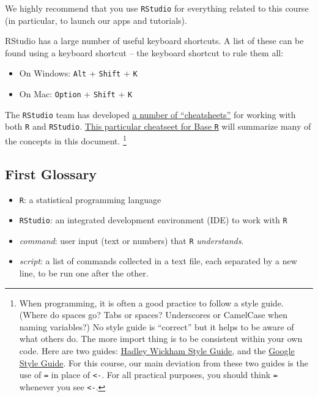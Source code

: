 \documentclass[]{book}
\providecommand{\tightlist}{%
  \setlength{\itemsep}{0pt}\setlength{\parskip}{0pt}}
\newenvironment{note}{\begin{tcolorbox}[colback=blue!5!white,colframe=blue!75!black]}{\end{tcolorbox}}
\begin{document}
\begin{note}
We highly recommend that you use \texttt{RStudio} for everything related
to this course (in particular, to launch our apps and tutorials).
\end{note}

RStudio has a large number of useful keyboard shortcuts. A list of these can be found using a keyboard shortcut -- the keyboard shortcut to rule them all:

\begin{itemize}
\tightlist
\item
  On Windows: \texttt{Alt} + \texttt{Shift} + \texttt{K}
\item
  On Mac: \texttt{Option} + \texttt{Shift} + \texttt{K}
\end{itemize}

The \texttt{RStudio} team has developed \href{https://www.rstudio.com/resources/cheatsheets/}{a number of ``cheatsheets''} for working with both \texttt{R} and \texttt{RStudio}. \href{http://www.rstudio.com/wp-content/uploads/2016/05/base-r.pdf}{This particular cheatseet for Base \texttt{R}} will summarize many of the concepts in this document. \footnote{When programming, it is often a good practice to follow a style guide. (Where do spaces go? Tabs or spaces? Underscores or CamelCase when naming variables?) No style guide is ``correct'' but it helps to be aware of what others do. The more import thing is to be consistent within your own code. Here are two guides: \href{http://adv-r.had.co.nz/Style.html}{Hadley Wickham Style Guide}, and the \href{https://google.github.io/styleguide/Rguide.xml}{Google Style Guide}. For this course, our main deviation from these two guides is the use of \texttt{=} in place of \texttt{\textless{}-}. For all practical purposes, you should think \texttt{=} whenever you see \texttt{\textless{}-}.}

\hypertarget{first-glossary}{%
\subsection{First Glossary}\label{first-glossary}}

\begin{itemize}
\tightlist
\item
  \texttt{R}: a statistical programming language
\item
  \texttt{RStudio}: an integrated development environment (IDE) to work with \texttt{R}
\item
  \emph{command}: user input (text or numbers) that \texttt{R} \emph{understands}.
\item
  \emph{script}: a list of commands collected in a text file, each separated by a new line, to be run one after the other.
\end{itemize}
\end{document}

